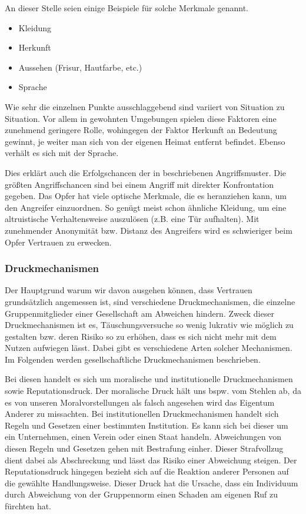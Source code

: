 An dieser Stelle seien einige Beispiele für solche Merkmale genannt.
\begin{itemize}
	\item Kleidung
	\item Herkunft
	\item Aussehen (Frisur, Hautfarbe, etc.)
	\item Sprache
\end{itemize}
Wie sehr die einzelnen Punkte ausschlaggebend sind variiert von Situation zu Situation.
Vor allem in gewohnten Umgebungen spielen diese Faktoren eine zunehmend geringere Rolle, wohingegen der Faktor Herkunft an Bedeutung gewinnt, je weiter man sich von der eigenen Heimat entfernt befindet. Ebenso verhält es sich mit der Sprache.
\cite{liars-and-outliers}

Dies erklärt auch die Erfolgschancen der in  beschriebenen Angriffsmuster.
Die größten Angriffschancen sind bei einem Angriff mit direkter Konfrontation gegeben.
Das Opfer hat viele optische Merkmale, die es heranziehen kann, um den Angreifer einzuordnen.
So genügt meist schon ähnliche Kleidung, um eine altruistische Verhaltensweise auszulösen (z.B. eine Tür aufhalten).
Mit zunehmender Anonymität bzw. Distanz des Angreifers wird es schwieriger beim Opfer Vertrauen zu erwecken.

\subsubsection{Druckmechanismen}\label{sec:druckmechanismen}
Der Hauptgrund warum wir davon ausgehen können, dass Vertrauen grundsätzlich angemessen ist, sind verschiedene Druckmechanismen, die einzelne Gruppenmitglieder einer Gesellschaft am Abweichen hindern.
Zweck dieser Druckmechanismen ist es, Täuschungsversuche so wenig lukrativ wie möglich zu gestalten bzw. deren Risiko so zu erhöhen, dass es sich nicht mehr mit dem Nutzen aufwiegen lässt.
Dabei gibt es verschiedene Arten solcher Mechanismen. Im Folgenden werden gesellschaftliche Druckmechanismen beschrieben.

Bei diesen handelt es sich um moralische und institutionelle Druckmechanismen sowie Reputationsdruck.
Der moralische Druck hält uns bspw. vom Stehlen ab, da es von unseren Moralvorstellungen als falsch angesehen wird das Eigentum Anderer zu missachten.
Bei institutionellen Druckmechanismen handelt sich Regeln und Gesetzen einer bestimmten Institution.
Es kann sich bei dieser um ein Unternehmen, einen Verein oder einen Staat handeln.
Abweichungen von diesen Regeln und Gesetzen gehen mit Bestrafung einher. Dieser Strafvollzug dient dabei als Abschreckung und lässt das Risiko einer Abweichung steigen.
Der Reputationsdruck hingegen bezieht sich auf die Reaktion anderer Personen auf die gewählte Handlungsweise.
Dieser Druck hat die Ursache, dass ein Individuum durch Abweichung von der Gruppennorm einen Schaden am eigenen Ruf zu fürchten hat.

